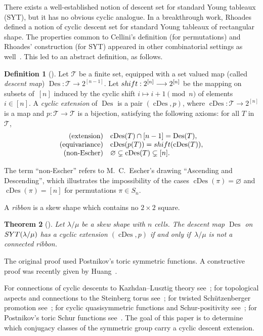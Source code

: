 \documentclass[10pt]{article}
\newtheorem{theorem}{Theorem}[section]
\theoremstyle{definition}
\newtheorem{definition}[theorem]{Definition}
\newcommand{\TTT}{\mathcal T}
\DeclareMathOperator\Des{Des}
\DeclareMathOperator\cDes{cDes}
\def\SYT{{\rm SYT}}
\begin{document}
There exists a well-established notion of descent set for standard Young tableaux (SYT), but it has no obvious cyclic analogue. 
In a breakthrough work, Rhoades~\cite{Rhoades} defined a notion of cyclic descent set for standard Young tableaux of rectangular shape.
The properties common to Cellini's definition (for permutations) and Rhoades' construction (for SYT) appeared in other combinatorial settings as well~\cite{PPR, Pechenik, ER, AER}.
This led to an abstract definition, as follows.
	
\begin{definition}[\cite{ARR}]\label{def:cDes}
Let $\TTT$ be a finite set, equipped with a set valued map (called {\em descent map}) 
$\Des: \TTT \longrightarrow 2^{[n-1]}$. 
Let ${\rm shift}: 2^{[n]} \longrightarrow 2^{[n]}$ be the mapping on subsets of~$[n]$ induced by the cyclic shift $i \mapsto i + 1 \pmod n$ of elements $i \in [n]$.
A {\em cyclic extension} of $\Des$ is
a pair $(\cDes,p)$, where 
$\cDes: \TTT \longrightarrow 2^{[n]}$ is a map 
and $p: \TTT \longrightarrow \TTT$ is a bijection,
satisfying the following axioms:  for all $T$ in  $\TTT$,
\[
\begin{array}{rl}
\text{(extension)}   & \cDes(T) \cap [n-1] = \Des(T),\\
\text{(equivariance)}& \cDes(p(T))  = {\rm shift}(\cDes(T)),\\
\text{(non-Escher)}  & \varnothing \subsetneq \cDes(T) \subsetneq [n].\\
\end{array}
\]
\end{definition}

The term ``non-Escher'' refers to M.\ C.\ Escher's drawing ``Ascending and Descending'', which illustrates the impossibility
of the cases $\cDes(\pi) = \varnothing$ and $\cDes(\pi) = [n]$ for permutations $\pi \in S_n$.

A {\em ribbon} is a skew shape which contains no $2 \times 2$ square.
	
\begin{theorem}[{\cite[Theorem 1.1]{ARR}}]\label{conj1}
    Let $\lambda/\mu$ be a skew shape with $n$ cells.
    The descent map $\Des$ on $\SYT(\lambda/\mu)$ has a cyclic extension $(\cDes,p)$ if and only if~$\lambda/\mu$ is not a connected ribbon.
\end{theorem}
	
The original proof used Postnikov's toric symmetric functions.
A constructive proof was recently given by Huang~\cite{Huang}.

For connections of cyclic descents to 
Kazhdan--Lusztig theory see~\cite{Rhoades}; for topological aspects and connections to the  
Steinberg torus see~\cite{DPS}; for twisted Sch\"utzenberger promotion see~\cite{Rhoades, Huang}; for cyclic quasisymmetric functions and Schur-positivity see~\cite{AGRR};	for Postnikov's toric Schur functions see~\cite{ARR}.
The goal of this paper is to determine which conjugacy classes of the symmetric group carry a cyclic descent extension.
		
\end{document}

